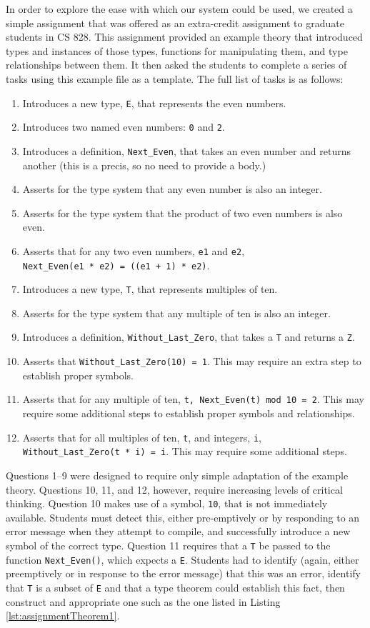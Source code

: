 In order to explore the ease with which our system could be used, we created a simple assignment that was offered as an extra-credit assignment to graduate students in CS 828.  This assignment provided an example theory that introduced types and instances of those types, functions for manipulating them, and type relationships between them.  It then asked the students to complete a series of tasks using this example file as a template.  The full list of tasks is as follows:

\begin{enumerate}
	\item Introduces a new type, \texttt{E}, that represents the even numbers.
	\item Introduces two named even numbers: \texttt{0} and \texttt{2}.
	\item Introduces a definition, \texttt{Next\_Even}, that takes an even number and returns another (this is a precis, so no need to provide a body.)
	\item Asserts for the type system that any even number is also an integer.
	\item Asserts for the type system that the product of two even numbers is also even.
	\item Asserts that for any two even numbers, \texttt{e1} and \texttt{e2}, \texttt{Next\_Even(e1~*~e2)~=~((e1~+~1)~*~e2)}.
	\item Introduces a new type, \texttt{T}, that represents multiples of ten.
	\item Asserts for the type system that any multiple of ten is also an integer.
	\item Introduces a definition, \texttt{Without\_Last\_Zero}, that takes a \texttt{T} and returns a \texttt{Z}.
	\item Asserts that \texttt{Without\_Last\_Zero(10)~=~1}.  This may require an extra step to establish proper symbols.
	\item Asserts that for any multiple of ten, \texttt{t,~Next\_Even(t)~mod~10~=~2}.  This may require some additional steps to establish proper symbols and relationships.
	\item Asserts that for all multiples of ten, \texttt{t}, and integers, \texttt{i}, \texttt{Without\_Last\_Zero(t~*~i)~=~i}.  This may require some additional steps.
\end{enumerate}

Questions 1--9 were designed to require only simple adaptation of the example theory.  Questions 10, 11, and 12, however, require increasing levels of critical thinking.  Question 10 makes use of a symbol, \texttt{10}, that is not immediately available.  Students must detect this, either pre-emptively or by responding to an error message when they attempt to compile, and successfully introduce a new symbol of the correct type.  Question 11 requires that a \texttt{T} be passed to the function \texttt{Next\_Even()}, which expects a \texttt{E}.  Students had to identify (again, either preemptively or in response to the error message) that this was an error, identify that \texttt{T} is a subset of \texttt{E} and that a type theorem could establish this fact, then construct and appropriate one such as the one listed in Listing \ref{lst:assignmentTheorem1}.

